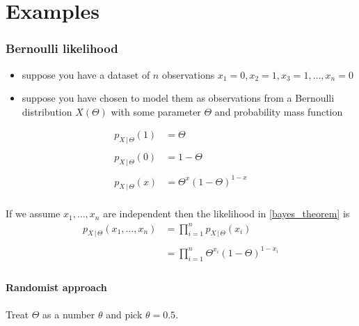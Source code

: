 \documentclass[14pt, reqno]{amsart}
\theoremstyle{definition}
\begin{document}
\part{Examples}

\section{Bernoulli likelihood}
\begin{itemize}
\item suppose you have a dataset of $n$ observations $x_1 = 0, x_2 = 1, x_3 = 1, \dots, x_n = 0$
\item suppose you have chosen to model them as observations from a Bernoulli distribution $X(\Theta)$ with some parameter $\Theta$ and probability mass function
\end{itemize}
\begin{equation}\label{bernoulli_pmf}
\begin{split}
p_{X \,|\, \Theta}(1) & = \Theta \\
\\
p_{X \,|\, \Theta}(0) & = 1 - \Theta \\
\\
p_{X \,|\, \Theta}(x) & = \Theta^x (1 - \Theta)^{1 - x} \\
\end{split}
\end{equation}

If we assume $x_1, \dots, x_n$ are independent then the likelihood in \eqref{bayes_theorem} is
\begin{equation}
\begin{split}
p_{X \,|\, \Theta}(x_1, \dots, x_n) & = \prod \limits _{i=1}^n p_{X \,|\, \Theta}(x_i) \\
\\
 & = \prod \limits _{i=1}^n \Theta^{x_i} (1 - \Theta)^{1 - x_i} \\
\end{split}
\end{equation}

\subsection{Randomist approach} Treat $\Theta$ as a number $\theta$ and pick $\theta = 0.5$.
\end{document}
